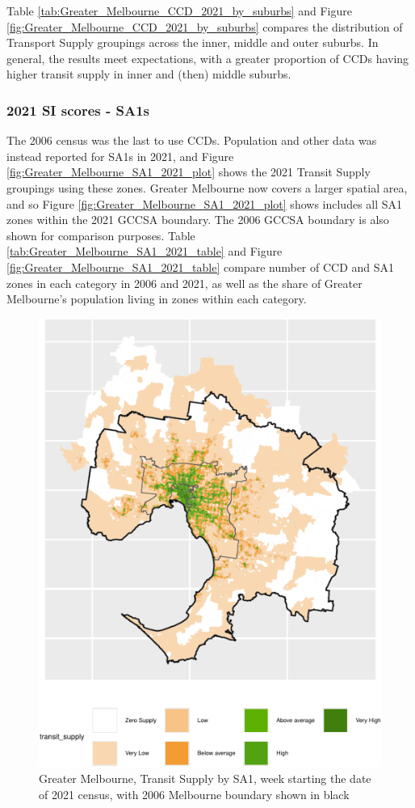 \documentclass[preprint, 3p,
authoryear]{elsarticle} %
\begin{document}
Table \ref{tab:Greater_Melbourne_CCD_2021_by_suburbs} and Figure
\ref{fig:Greater_Melbourne_CCD_2021_by_suburbs} compares the
distribution of Transport Supply groupings across the inner, middle and
outer suburbs. In general, the results meet expectations, with a greater
proportion of CCDs having higher transit supply in inner and (then)
middle suburbs.

\subsubsection{2021 SI scores - SA1s}\label{si-scores---sa1s}

The 2006 census was the last to use CCDs. Population and other data was
instead reported for SA1s in 2021, and Figure
\ref{fig:Greater_Melbourne_SA1_2021_plot} shows the 2021 Transit Supply
groupings using these zones. Greater Melbourne now covers a larger
spatial area, and so Figure \ref{fig:Greater_Melbourne_SA1_2021_plot}
shows includes all SA1 zones within the 2021 GCCSA boundary. The 2006
GCCSA boundary is also shown for comparison purposes. Table
\ref{tab:Greater_Melbourne_SA1_2021_table} and Figure
\ref{fig:Greater_Melbourne_SA1_2021_table} compare number of CCD and SA1
zones in each category in 2006 and 2021, as well as the share of Greater
Melbourne's population living in zones within each category.

\begin{figure}
\centering
\includegraphics{Leveraging_GTFS_to_assess_transit_supply_Transport_Geography_files/figure-latex/Greater_Melbourne_SA1_2021_plot-1.pdf}
\caption{Greater Melbourne, Transit Supply by SA1, week starting the
date of 2021 census, with 2006 Melbourne boundary shown in black}
\end{figure}
\end{document}
